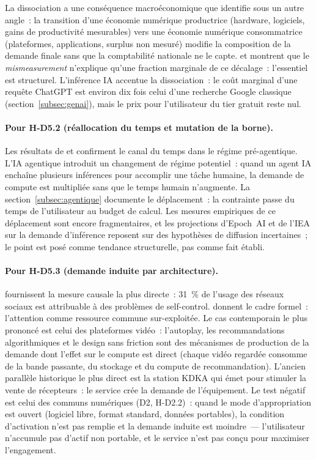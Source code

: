 La dissociation a une conséquence macroéconomique que \textcite{vanark_productivity_2016} identifie sous un autre angle~: la transition d'une économie numérique productrice (hardware, logiciels, gains de productivité mesurables) vers une économie numérique consommatrice (plateformes, applications, surplus non mesuré) modifie la composition de la demande finale sans que la comptabilité nationale ne le capte. \textcite{byrne_digital_2022} et \textcite{syverson_challenges_2017} montrent que le \emph{mismeasurement} n'explique qu'une fraction marginale de ce décalage~: l'essentiel est structurel. L'inférence IA accentue la dissociation~: le coût marginal d'une requête ChatGPT est environ dix fois celui d'une recherche Google classique (section~\ref{subsec:genai}), mais le prix pour l'utilisateur du tier gratuit reste nul.

\paragraph{Pour H-D5.2 (réallocation du temps et mutation de la borne).} Les résultats de \textcite{kopytov_cheap_2023} et \textcite{aguiar_leisure_2021} confirment le canal du temps dans le régime pré-agentique. L'IA agentique introduit un changement de régime potentiel~: quand un agent IA enchaîne plusieurs inférences pour accomplir une tâche humaine, la demande de compute est multipliée sans que le temps humain n'augmente. La section~\ref{subsec:agentique} documente le déplacement~: la contrainte passe du temps de l'utilisateur au budget de calcul. Les mesures empiriques de ce déplacement sont encore fragmentaires, et les projections d'Epoch~AI et de l'IEA sur la demande d'inférence reposent sur des hypothèses de diffusion incertaines~; le point est posé comme tendance structurelle, pas comme fait établi.

\paragraph{Pour H-D5.3 (demande induite par architecture).} \textcite{allcott_digital_2022} fournissent la mesure causale la plus directe~: 31~\% de l'usage des réseaux sociaux est attribuable à des problèmes de self-control. \textcite{anderson_competition_2012} donnent le cadre formel~: l'attention comme ressource commune sur-exploitée. Le cas contemporain le plus prononcé est celui des plateformes vidéo~: l'autoplay, les recommandations algorithmiques et le design sans friction sont des mécanismes de production de la demande dont l'effet sur le compute est direct (chaque vidéo regardée consomme de la bande passante, du stockage et du compute de recommandation). L'ancien parallèle historique le plus direct est la station KDKA qui émet pour stimuler la vente de récepteurs~: le service crée la demande de l'équipement. Le test négatif est celui des communs numériques (D2, H-D2.2)~: quand le mode d'appropriation est ouvert (logiciel libre, format standard, données portables), la condition d'activation n'est pas remplie et la demande induite est moindre~--- l'utilisateur n'accumule pas d'actif non portable, et le service n'est pas conçu pour maximiser l'engagement.


